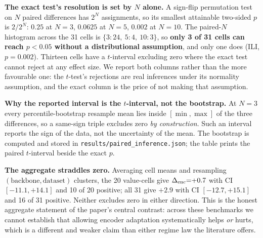\textbf{The exact test's resolution is set by $N$ alone.} A sign-flip permutation
test on $N$ paired differences has $2^N$ assignments, so its smallest attainable
two-sided $p$ is $2/2^N$: $0.25$ at $N{=}3$, $0.0625$ at $N{=}5$, $0.002$ at
$N{=}10$.  The paired-$N$ histogram across the 31 cells is $\{3{:}24,\ 5{:}4,\
10{:}3\}$, so \textbf{only 3 of 31 cells can reach $p{<}0.05$ without a
distributional assumption}, and only one does (ILI, $p{=}0.002$).  Thirteen cells
have a $t$-interval excluding zero where the exact test cannot reject at any
effect size.  We report both columns rather than the more favourable one: the
$t$-test's rejections are real inferences under its normality assumption, and the
exact column is the price of not making that assumption.

\textbf{Why the reported interval is the $t$-interval, not the bootstrap.} At
$N{=}3$ every percentile-bootstrap resample mean lies inside $[\min, \max]$ of the
three differences, so a same-sign triple excludes zero \emph{by construction}.
Such an interval reports the sign of the data, not the uncertainty of the mean.
The bootstrap is computed and stored in \texttt{results/paired\_inference.json};
the table prints the paired $t$-interval beside the exact $p$.

\textbf{The aggregate straddles zero.} Averaging cell means and resampling
$(\text{backbone}, \text{dataset})$ clusters, the 20 value-cells give
$\Delta_\text{enc}{=}{+}0.7$ with CI $[-11.1, {+}14.1]$ and 10 of 20 positive; all 31 give
$+2.9$ with CI $[-12.7, {+}15.1]$ and 16 of 31 positive.  Neither excludes zero in
either direction.  This is the honest aggregate statement of the paper's central
contrast: across these benchmarks we cannot establish that allowing encoder
adaptation systematically helps \emph{or} hurts, which is a different and weaker
claim than either regime law the literature offers.

